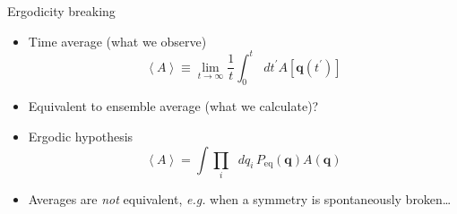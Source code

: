 \documentclass{beamer}
\newcommand{\av}[1]{\left<#1\right>}
\newcommand{\sbr}[1]{\left[#1\right]}
\newcommand{\dif}{\mathop{}\!d}
\renewcommand{\vec}[1]{\bm{#1}}
\begin{document}
\begin{frame}{Ergodicity breaking}
  \begin{itemize}
    \item Time average (what we observe)
      \begin{equation*}
        \av{A} \equiv 
        \lim_{t\to\infty} \frac{1}{t}
        \int_0^t \dif t^{\prime} A\sbr{\vec{q}(t^{\prime})}
      \end{equation*}
    \item Equivalent to ensemble average (what we calculate)?
    \item \alert{Ergodic hypothesis}
      \begin{equation*}
        \av{A} = \int \prod_i \dif q_i\,P_{\text{eq}}(\vec{q}) A(\vec{q})
      \end{equation*}
    \item Averages are \emph{not} equivalent, \textit{e.g.} when a symmetry is
      spontaneously broken\dots
  \end{itemize}
\end{frame}
\end{document}
